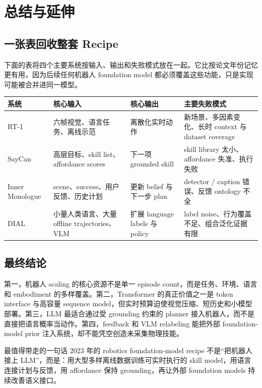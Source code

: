 \section{总结与延伸}

\subsection{一张表回收整套 Recipe}

下面的表将四个主要系统按输入、输出和失败模式放在一起。它比按论文年份记忆更有用，因为后续任何机器人 foundation model 都必须覆盖这些功能，只是实现可能被合并进同一模型。

\begin{longtable}{@{}L{0.16\textwidth}L{0.22\textwidth}L{0.23\textwidth}L{0.27\textwidth}@{}}
\toprule
系统 & 核心输入 & 核心输出 & 主要失败模式 \\
\midrule
RT-1 & 六帧视觉、语言任务、离线示范 & 离散化实时动作 & 新场景、多因素变化、长时 context 与 dataset coverage \\
SayCan & 高层目标、skill list、affordance scores & 下一项 grounded skill & skill library 太小、affordance 失准、执行失败 \\
Inner Monologue & scene、success、用户反馈、历史计划 & 更新 belief 与下一步 plan & detector / caption 错误、反馈 ontology 不全 \\
DIAL & 小量人类语言、大量 offline trajectories、VLM & 扩展 language labels 与 policy & label noise、行为覆盖不足、组合泛化证据有限 \\
\bottomrule
\end{longtable}

\subsection{最终结论}

第一，机器人 scaling 的核心资源不是单一 episode count，而是任务、环境、语言和 embodiment 的多样覆盖。第二，Transformer 的真正价值之一是 token interface 与高容量 sequence model，但实时预算迫使视觉压缩、短历史和小模型部署。第三，LLM 最适合通过受 grounding 约束的 planner 接入机器人，而不是直接把语言概率当动作。第四，feedback 和 VLM relabeling 能把外部 foundation-model prior 注入系统，却不能凭空创造未采集物理技能。

\begin{importantbox}{最值得带走的一句话}
2023 年的 robotics foundation-model recipe 不是“把机器人接上 LLM”，而是：用大型多样离线数据训练可实时执行的 skill model，用语言连接计划与反馈，用 affordance 保持 grounding，再让外部 foundation models 持续改善语义接口。
\end{importantbox}

